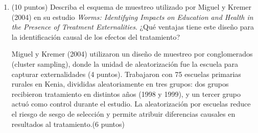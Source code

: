 \documentclass[10pt,a4paper]{article}
\begin{document}
\begin{enumerate}
{    Luego, 
    $$E\left[\hat{b}_{1}\right]=\frac{\operatorname{Cov}(X, Y)}{\operatorname{Var}(X)}=\frac{\operatorname{Cov}\left(X^{*}+u, Y\right)}{\operatorname{Var}\left(X^{*}+u\right)}$$

    Dado que el error es clásico: $\operatorname{Cov}(u, Y)=0$ por lo que:
    $$E\left[\hat{b}_{1}\right]=\frac{\operatorname{Cov}\left(X^{*}, Y\right)}{\operatorname{Var}\left(X^{*}+u\right)}$$
    Además, el denominador lo podemos escribir como la suma de varianzas:
    $$\operatorname{Var}\left(X^{*}+u\right)=\operatorname{Var}\left(X^{*}\right)+\operatorname{Var}(u)$$
    
    Reemplazando $Y$ por el modelo original (1):
    $$E\left[\hat{b}_{1}\right]=\frac{\operatorname{Cov}\left(X^{*}, \beta_{0}+\beta_{1} X^{*}+\epsilon\right)}{\operatorname{Var}\left(X^{*}\right)+\operatorname{Var}(u)}$$
    separando las covarianzas:
    $$E\left[\hat{b}_{1}\right]=\frac{\beta_{1} \operatorname{Cov}\left(X^{*}, X^{*}\right)+\operatorname{Cov}\left(X^{*}, \epsilon\right)}{\operatorname{Var}\left(X^{*}\right)+\operatorname{Var}(u)}$$
    Además, sabemos que $\operatorname{Cov}\left(X^{*}, \epsilon\right)=0$. y $\operatorname{Cov}\left(X^{*}, X^{*}\right)=\operatorname{Var}\left(X^{*}\right)$.
    Entonces:
    $$E\left(\hat{b}_{1}\right)=\beta_{1} \frac{\operatorname{Var}\left(X^{*}\right)}{\operatorname{Var}\left(X^{*}\right)+\operatorname{Var}(u)}=a \cdot \beta_{1}$$
    Por lo tanto, al ser insesgado el estimador de $\beta_1$ cuando el error de medición está en la variable dependiente, y al ser sesgado cuando está en la independiente, entonces Milana tiene la razón. \\(5 puntos por concluir bien)\\
    
    (No es necesario hacer toda la matemática para obtener el puntaje, si la explicación está bien)
    
}

    \item (10 puntos) Describa el esquema de muestreo utilizado por Miguel y Kremer (2004) en su estudio {\it Worms: Identifying Impacts on Education and Health in the Presence of Treatment Externalities}.
    ¿Qué ventajas tiene este diseño para la identificación causal de los efectos del tratamiento?

    {\color{blue} Miguel y Kremer (2004) utilizaron un diseño de muestreo por conglomerados (cluster sampling), donde la unidad de aleatorización fue la escuela para capturar externalidades (4 puntos). Trabajaron con 75 escuelas primarias rurales en Kenia, divididas aleatoriamente en tres grupos: dos grupos recibieron tratamiento en distintos años (1998 y 1999), y un tercer grupo actuó como control durante el estudio.
    La aleatorización por escuelas reduce el riesgo de sesgo de selección y permite atribuir diferencias causales en resultados al tratamiento.(6 puntos)}


\end{enumerate}
\end{document}
